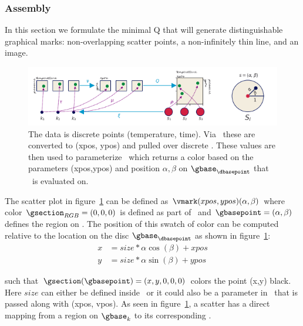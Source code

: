 \documentclass[../main.tex]{subfiles}
\begin{document}
\subsubsection{Assembly \vmark}
In this section we formulate the minimal Q that will generate distinguishable graphical marks: non-overlapping scatter points, a non-infinitely thin line, and an image. 
\begin{figure}[H]
    \includegraphics[width=1\textwidth]{figures/math/scatter.png}
    \caption{The data is discrete points (temperature, time). Via \vchannel\ these are converted to (xpos, ypos) and pulled over discrete \gbase. These values are then used to parameterize \gsection\ which returns a color based on the parameters (xpos,ypos) and position $\alpha, \beta$ on $\gbase_{\dbasepoint}$ that \gsection\ is evaluated on. 
    }
    \label{fig:artist_scatter}
\end{figure}
The scatter plot in figure~\ref{fig:artist_scatter} can be defined as $\vmark(xpos, ypos)(\alpha, \beta)$ where color $\gsection_{RGB} = (0,0,0)$ is defined as part of \vmark\ and $\gbasepoint=(\alpha, \beta)$ defines the region on \gbase. The position of this swatch of color can be computed relative to the location on the disc $\gbase_{\dbasepoint}$ as shown in figure~\ref{fig:artist_scatter}:
\begin{align}
x &= size *\alpha \cos(\beta) + xpos \\
y &= size *\alpha \sin(\beta) + ypos
\end{align}

such that $\gsection(\gbasepoint) = (x, y, 0, 0, 0)$ colors the point (x,y) black. Here $size$ can either be defined inside \vmark\ or it could also be a parameter in \vtotal\ that is passed along with (xpos, vpos). As seen in figure~\ref{fig:artist_scatter}, a scatter has a direct mapping from a region on $\gbase_{k}$ to its corresponding \dbasepoint. 
\end{document}
